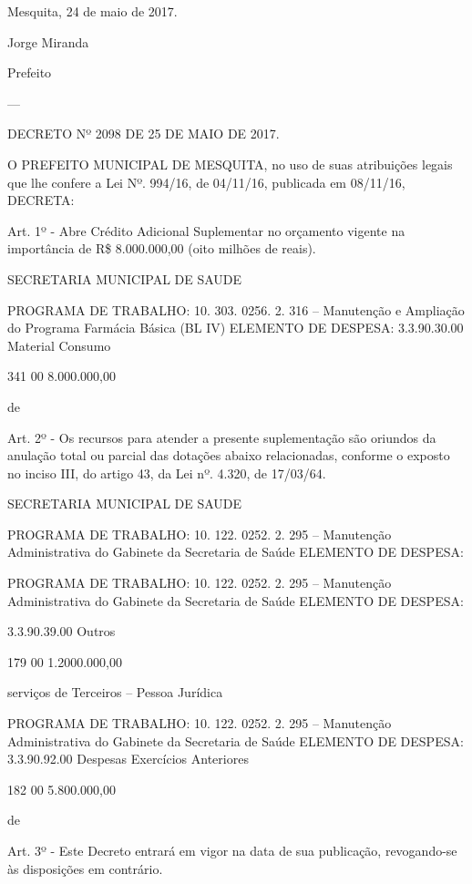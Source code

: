 \documentclass{doliberto}
\begin{document}
 

Mesquita, 24 de maio de 2017.  

Jorge Miranda 

Prefeito 

---

DECRETO Nº 2098 DE 25 DE MAIO DE 2017. 
 
 
O  PREFEITO  MUNICIPAL  DE  MESQUITA,  no  uso  de  suas 
atribuições  legais  que  lhe  confere  a  Lei  Nº.  994/16,  de 
04/11/16, publicada em 08/11/16, DECRETA: 
 
 
Art. 1º - Abre Crédito Adicional Suplementar no orçamento 
vigente na importância de R\$ 8.000.000,00 (oito milhões de 
reais). 
 
 
SECRETARIA MUNICIPAL DE SAUDE 
 
 
PROGRAMA DE TRABALHO: 
10.  303.  0256.  2.  316  –  Manutenção  e  Ampliação  do 
Programa Farmácia Básica (BL IV) 
ELEMENTO DE DESPESA: 
3.3.90.30.00  Material 
Consumo 

341  00  8.000.000,00 

de 
 
Art. 2º - Os recursos para atender a presente suplementação 
são  oriundos  da  anulação  total  ou  parcial  das  dotações 
abaixo  relacionadas,  conforme  o  exposto  no  inciso  III,  do 
artigo 43, da Lei nº. 4.320, de 17/03/64. 
 
 
SECRETARIA MUNICIPAL DE SAUDE 
 
 
PROGRAMA DE TRABALHO: 
10.  122.  0252.  2.  295  –  Manutenção  Administrativa  do 
Gabinete da Secretaria de Saúde 
ELEMENTO DE DESPESA: 

 

 
 
PROGRAMA DE TRABALHO: 
10.  122.  0252.  2.  295  –  Manutenção  Administrativa  do 
Gabinete da Secretaria de Saúde 
ELEMENTO DE DESPESA: 

3.3.90.39.00  Outros 

179  00  1.2000.000,00 

serviços  de 
Terceiros 
– 
Pessoa 
Jurídica 

 
 
PROGRAMA DE TRABALHO: 
10.  122.  0252.  2.  295  –  Manutenção  Administrativa  do 
Gabinete da Secretaria de Saúde  
ELEMENTO DE DESPESA: 
3.3.90.92.00  Despesas 
Exercícios 
Anteriores 

182  00  5.800.000,00 

de 

 
Art.  3º  -  Este  Decreto  entrará  em  vigor  na  data  de  sua 
publicação, revogando-se às disposições em contrário.  
 
\end{document}
